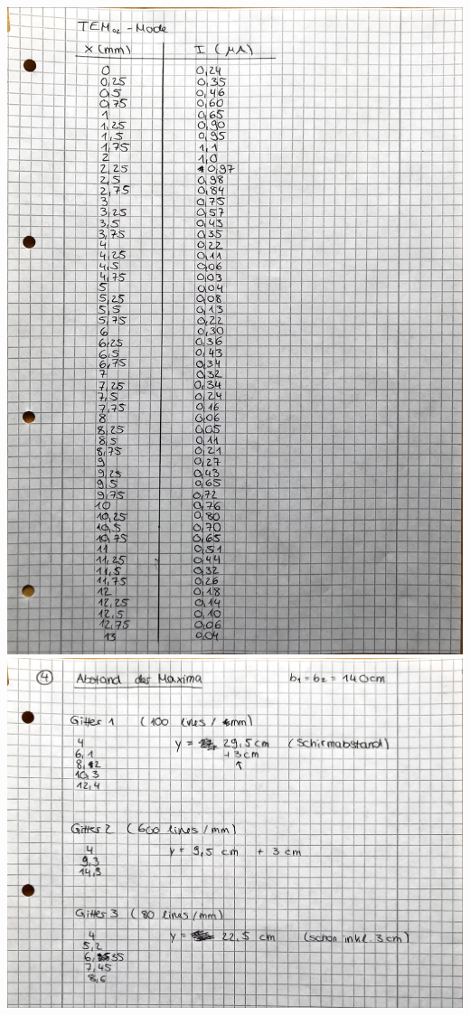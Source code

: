 \includegraphics[width=\textwidth]{fotos/Messung_TEM02.JPG}
\includegraphics[width=\textwidth]{fotos/Messung_Maxima.JPG}




